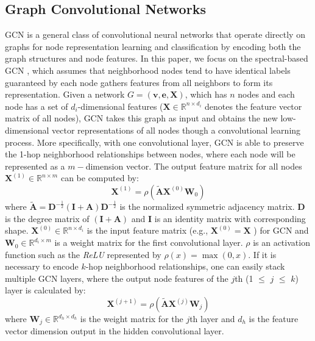 \documentclass[conference]{IEEEtran}
\begin{document}
\subsection{Graph Convolutional Networks}
GCN \cite{wu2019comprehensive} is a general class of convolutional neural networks that operate directly on graphs for node representation learning and classification by encoding both the graph structures and node features. In this paper, we focus on the spectral-based GCN \cite{15}, which assumes that neighborhood nodes tend to have identical labels guaranteed by each node gathers features from all neighbors to form its representation. Given a network $G=(\mathbf{v},\mathbf{e},\mathbf{X})$, which has $n$ nodes and each node has a set of $d_i$-dimensional features ($\mathbf{X}\in \mathbb{R}^{n \times {d_i}}$ denotes the feature vector matrix of all nodes), GCN takes this graph as input and obtains the new low-dimensional vector representations of all nodes though a convolutional learning process. More specifically, with one convolutional layer, GCN is able to preserve the 1-hop neighborhood relationships between nodes, where each node will be represented as a $m-$dimension vector. The output feature matrix for all nodes $\mathbf{X}^{(1)} \in \mathbb{R}^{n \times m}$ can be computed by:
\begin{equation}
\mathbf{X}^{(1)} = \rho (\tilde{\mathbf{A}} \mathbf{X}^{(0)} \mathbf{W}_{0})
\end{equation}
where $\tilde{\mathbf{A}}=\mathbf{D}^{-\frac{1}{2}}(\mathbf{I}+\mathbf{A})\mathbf{D}^{-\frac{1}{2}}$ is the normalized symmetric adjacency matrix. $\mathbf{D}$ is the degree matrix of $(\mathbf{I}+\mathbf{A})$ and $\mathbf{I}$ is an identity matrix with corresponding shape. $\mathbf{X}^{(0)} \in \mathbb{R}^{n \times d_i}$ is the input feature matrix (e.g., $\mathbf{X}^{(0)} = \mathbf{X}$ ) for GCN and $\mathbf{W}_{0} \in \mathbb{R}^{d_i\times m}$ is a weight matrix for the first convolutional layer. $\rho$ is an activation function such as the \textit{ReLU} represented by $\rho (x) = \max (0,x)$. If it is necessary to encode $k$-hop neighborhood relationships, one can easily stack multiple GCN layers, where the output node features of the $j$th (1 $\leq$ $j$ $\leq$ $k$) layer is calculated by:
\begin{equation}
\mathbf{X}^{(j+1)} = \rho (\tilde{\mathbf{A}} \mathbf{X}^{(j)} \mathbf{W}_{j})
\end{equation}
where $\mathbf{W}_j \in \mathbb{R}^{d_h \times d_h}$ is the weight matrix for the $j$th layer and $d_h$ is the feature vector dimension output in the hidden convolutional layer.
\end{document}
